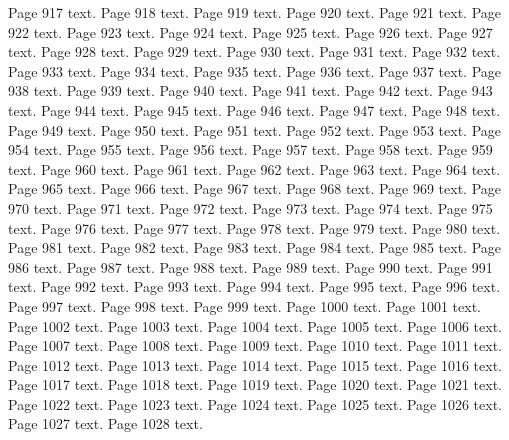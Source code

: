 \documentclass{article}
\begin{document}
Page 917 text.\newpage
Page 918 text.\newpage
Page 919 text.\newpage
Page 920 text.\newpage
Page 921 text.\newpage
Page 922 text.\newpage
Page 923 text.\newpage
Page 924 text.\newpage
Page 925 text.\newpage
Page 926 text.\newpage
Page 927 text.\newpage
Page 928 text.\newpage
Page 929 text.\newpage
Page 930 text.\newpage
Page 931 text.\newpage
Page 932 text.\newpage
Page 933 text.\newpage
Page 934 text.\newpage
Page 935 text.\newpage
Page 936 text.\newpage
Page 937 text.\newpage
Page 938 text.\newpage
Page 939 text.\newpage
Page 940 text.\newpage
Page 941 text.\newpage
Page 942 text.\newpage
Page 943 text.\newpage
Page 944 text.\newpage
Page 945 text.\newpage
Page 946 text.\newpage
Page 947 text.\newpage
Page 948 text.\newpage
Page 949 text.\newpage
Page 950 text.\newpage
Page 951 text.\newpage
Page 952 text.\newpage
Page 953 text.\newpage
Page 954 text.\newpage
Page 955 text.\newpage
Page 956 text.\newpage
Page 957 text.\newpage
Page 958 text.\newpage
Page 959 text.\newpage
Page 960 text.\newpage
Page 961 text.\newpage
Page 962 text.\newpage
Page 963 text.\newpage
Page 964 text.\newpage
Page 965 text.\newpage
Page 966 text.\newpage
Page 967 text.\newpage
Page 968 text.\newpage
Page 969 text.\newpage
Page 970 text.\newpage
Page 971 text.\newpage
Page 972 text.\newpage
Page 973 text.\newpage
Page 974 text.\newpage
Page 975 text.\newpage
Page 976 text.\newpage
Page 977 text.\newpage
Page 978 text.\newpage
Page 979 text.\newpage
Page 980 text.\newpage
Page 981 text.\newpage
Page 982 text.\newpage
Page 983 text.\newpage
Page 984 text.\newpage
Page 985 text.\newpage
Page 986 text.\newpage
Page 987 text.\newpage
Page 988 text.\newpage
Page 989 text.\newpage
Page 990 text.\newpage
Page 991 text.\newpage
Page 992 text.\newpage
Page 993 text.\newpage
Page 994 text.\newpage
Page 995 text.\newpage
Page 996 text.\newpage
Page 997 text.\newpage
Page 998 text.\newpage
Page 999 text.\newpage
Page 1000 text.\newpage
Page 1001 text.\newpage
Page 1002 text.\newpage
Page 1003 text.\newpage
Page 1004 text.\newpage
Page 1005 text.\newpage
Page 1006 text.\newpage
Page 1007 text.\newpage
Page 1008 text.\newpage
Page 1009 text.\newpage
Page 1010 text.\newpage
Page 1011 text.\newpage
Page 1012 text.\newpage
Page 1013 text.\newpage
Page 1014 text.\newpage
Page 1015 text.\newpage
Page 1016 text.\newpage
Page 1017 text.\newpage
Page 1018 text.\newpage
Page 1019 text.\newpage
Page 1020 text.\newpage
Page 1021 text.\newpage
Page 1022 text.\newpage
Page 1023 text.\newpage
Page 1024 text.\newpage
Page 1025 text.\newpage
Page 1026 text.\newpage
Page 1027 text.\newpage
Page 1028 text.\newpage
\end{document}
